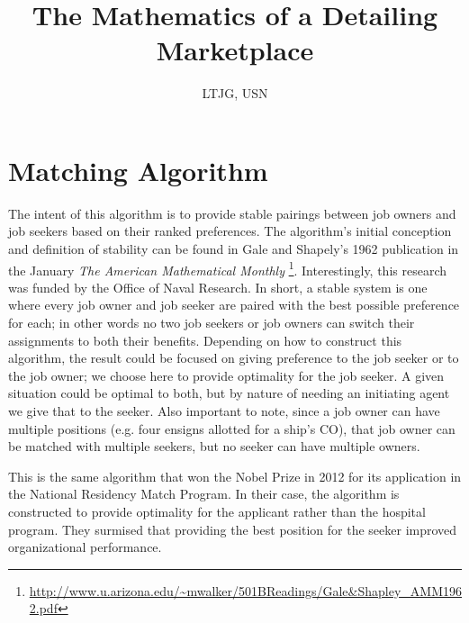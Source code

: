\documentclass{article}
\title{The Mathematics of a Detailing Marketplace}
\author{\studentname \qquad LTJG, USN}
\begin{document}
\maketitle

\section{Matching Algorithm}

The intent of this algorithm is to provide stable pairings between job owners and job seekers based on their ranked preferences. The algorithm's initial conception and definition of stability can be found in Gale and Shapely's 1962 publication in the January \textit{The American Mathematical Monthly} \footnote{\url{http://www.u.arizona.edu/~mwalker/501BReadings/Gale&Shapley_AMM1962.pdf}}. Interestingly, this research was funded by the Office of Naval Research. In short, a stable system is one where every job owner and job seeker are paired with the best possible preference for each; in other words no two job seekers or job owners can switch their assignments to both their benefits. Depending on how to construct this algorithm, the result could be focused on giving preference to the job seeker or to the job owner; we choose here to provide optimality for the job seeker. A given situation could be optimal to both, but by nature of needing an initiating agent we give that to the seeker. Also important to note, since a job owner can have multiple positions (e.g. four ensigns allotted for a ship's CO), that job owner can be matched with multiple seekers, but no seeker can have multiple owners.

This is the same algorithm that won the Nobel Prize in 2012 for its application in the National Residency Match Program. In their case, the algorithm is constructed to provide optimality for the applicant rather than the hospital program. They surmised that providing the best position for the seeker improved organizational performance.









\end{document}
